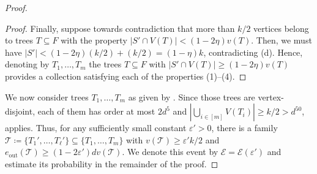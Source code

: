 \documentclass[reqno,final,a4paper]{amsart}
\theoremstyle{definition}
\newcommand{\cE}{\mathcal{E}}
\newcommand{\cT}{\mathcal{T}}
\def\eps{\varepsilon}
\newcommand{\1}{\mathbbm{1}}
\begin{document}
\begin{proof}
\begin{proof}
Finally, suppose towards contradiction that more than $k/2$ vertices belong to trees $T\subseteq F$ with the property $|S'\cap V(T)| < (1-2\eta)v(T)$.
Then, we must have $|S'| < (1-2\eta)(k/2) + (k/2) = (1-\eta)k$, contradicting (d).
Hence, denoting by $T_1,\ldots,T_m$ the trees $T\subseteq F$ with $|S'\cap V(T)| \ge (1-2\eta)v(T)$ provides a collection satisfying each of the properties (1)--(4).
\end{proof}

We now consider trees $T_1, \ldots, T_m$ as given by . 
Since those trees are vertex-disjoint, each of them has order at most $2d^5$ and $|\bigcup_{i\in [m]} V(T_i)|\ge k/2>d^{50}$,  applies. 
Thus, for any sufficiently small constant $\eps'>0$, there is a family $\cT\coloneqq \{T_1',\ldots, T_{\ell}'\}\subseteq \{T_1,\ldots, T_m\}$ with $v(\cT)\ge \eps' k/2$ and $e_{\mathrm{out}}(\cT)\ge (1-2\eps')dv(\cT)$. 
We denote this event by $\cE = \cE(\eps')$ and estimate its probability in the remainder of the proof.




\end{proof}
\end{document}
